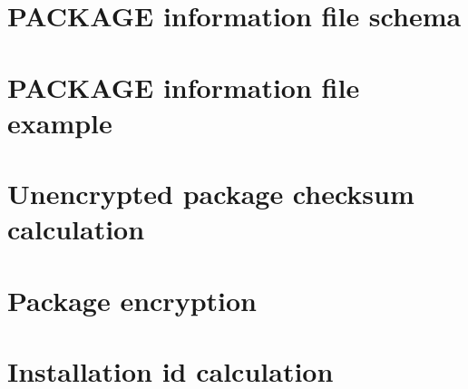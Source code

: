 \section[sec:package information file schema]{PACKAGE information file schema}

\section[sec:package information file example]{PACKAGE information file example}

\section[sec:unencrypted package checksum calculation]{Unencrypted package checksum calculation}

\section[sec:package encryption implementation]{Package encryption}

\section[sec:installation id calculation]{Installation id calculation}

